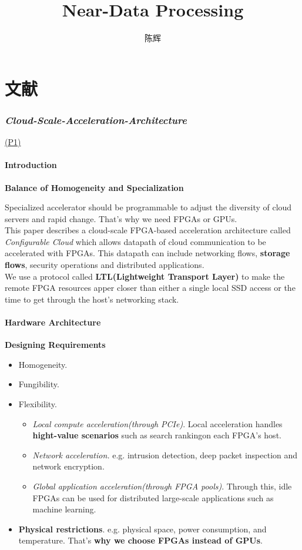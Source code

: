 \documentclass{article}
\title{Near-Data Processing}
\author{陈辉}
\date{}
\newcommand{\paper}[2]{\hyperlink{./papers/#1.pdf.#2}{(P#2)}}
\begin{document}
\maketitle
\tableofcontents
\newpage
\part{文献}
\section{\textit{Cloud-Scale-Acceleration-Architecture}}
\paper{Cloud-Scale-Acceleration-Architecture}{1}
\subsection{Introduction}
\textbf{Balance of Homogeneity and Specialization}\par
Specialized accelerator should be programmable to adjust the diversity of cloud servers and rapid change. That's why we need FPGAs or GPUs.\\

This paper describes a cloud-scale FPGA-based acceleration architecture called \textit{Configurable Cloud} which allows datapath of cloud communication to be accelerated with FPGAs. This datapath can include networking flows, \textbf{storage flows}, security operations and distributed applications.\\

We use a protocol called \textbf{LTL(Lightweight Transport Layer)} to make the remote FPGA resources apper closer than either a single local SSD access or the time to get through the host's networking stack.\\

\subsection{Hardware Architecture}
\textbf{Designing Requirements}
\begin{itemize}
\item Homogeneity.
\item Fungibility.
\item Flexibility.

\begin{itemize}
\item \textit{Local compute acceleration(through PCIe)}.
Local acceleration handles \textbf{hight-value scenarios} such as search rankingon each FPGA's host. 
\item \textit{Network acceleration.} 
e.g. intrusion detection, deep packet inspection and network encryption.
\item \textit{Global application acceleration(through FPGA pools)}. Through this, idle FPGAs can be used for distributed large-scale applications such as machine learning.
\end{itemize}

\item \textbf{Physical restrictions}. e.g. physical space, power consumption, and temperature. That's \textbf{why we choose FPGAs instead of GPUs}.
\end{itemize}
\end{document}
